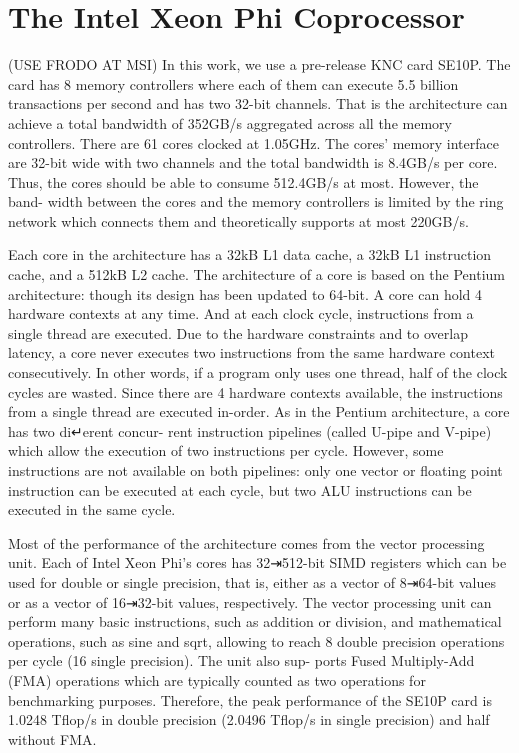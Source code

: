 \section{The Intel Xeon Phi Coprocessor}
(USE FRODO AT MSI)
In this work, we use a pre-release KNC card SE10P. The card has 8 memory controllers where each of them can execute 5.5 billion transactions per second and has two 32-bit channels. That is the architecture can achieve a total bandwidth of 352GB/s aggregated across all the memory controllers. There are 61 cores clocked at 1.05GHz. The cores’ memory interface are 32-bit wide with two channels and the total bandwidth is 8.4GB/s per core. Thus, the cores should be able to consume 512.4GB/s at most. However, the band- width between the cores and the memory controllers is limited by the ring network which connects them and theoretically supports at most 220GB/s.

Each core in the architecture has a 32kB L1 data cache, a 32kB L1 instruction cache, and a 512kB L2 cache. The architecture of a core is based on the Pentium architecture: though its design has been updated to 64-bit. A core can hold 4 hardware contexts at any time. And at each clock cycle, instructions from a single thread are executed. Due to the hardware constraints and to overlap latency, a core never executes two instructions from the same hardware context consecutively. In other words, if a program only uses one thread, half of the clock cycles are wasted. Since there are 4 hardware contexts available, the instructions from a single thread are executed in-order. As in the Pentium architecture, a core has two di↵erent concur- rent instruction pipelines (called U-pipe and V-pipe) which allow the execution of two instructions per cycle. However, some instructions are not available on both pipelines: only one vector or floating point instruction can be executed at each cycle, but two ALU instructions can be executed in the same cycle.

Most of the performance of the architecture comes from the vector processing unit. Each of Intel Xeon Phi’s cores has 32⇥512-bit SIMD registers which can be used for double or single precision, that is, either as a vector of 8⇥64-bit values or as a vector of 16⇥32-bit values, respectively. The vector processing unit can perform many basic instructions, such as addition or division, and mathematical operations, such as sine and sqrt, allowing to reach 8 double precision operations per cycle (16 single precision). The unit also sup- ports Fused Multiply-Add (FMA) operations which are typically counted as two operations for benchmarking purposes. Therefore, the peak performance of the SE10P card is 1.0248 Tflop/s in double precision (2.0496 Tflop/s in single precision) and half without FMA.
